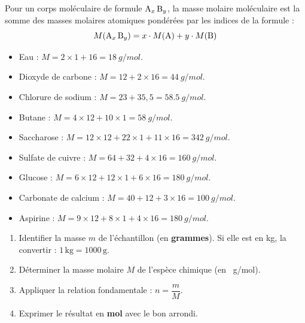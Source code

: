 \documentclass[11pt]{article}
\begin{document}
\begin{propriete}
Pour un corps moléculaire de formule $\ce{A_x B_y}$, la masse molaire moléculaire est la somme des masses molaires atomiques pondérées par les indices de la formule :
\[
M(\ce{A_x B_y}) = x \cdot M(\ce{A}) + y \cdot M(\ce{B})
\]
\end{propriete}

\begin{exemplebox}
\begin{itemize}
\item Eau  : $M = 2 \times 1 + 16 = \SI{18}{g/mol}$.
\item Dioxyde de carbone  : $M = 12 + 2 \times 16 = \SI{44}{g/mol}$.
\item Chlorure de sodium  : $M = 23 + 35,5 = \SI{58,5}{g/mol}$.
\item Butane  : $M = 4 \times 12 + 10 \times 1 = \SI{58}{g/mol}$.
\item Saccharose  : $M = 12 \times 12 + 22 \times 1 + 11 \times 16 = \SI{342}{g/mol}$.
\item Sulfate de cuivre  : $M = 64 + 32 + 4 \times 16 = \SI{160}{g/mol}$.
\item Glucose  : $M = 6 \times 12 + 12 \times 1 + 6 \times 16 = \SI{180}{g/mol}$.
\item Carbonate de calcium  : $M = 40 + 12 + 3 \times 16 = \SI{100}{g/mol}$.
\item Aspirine  : $M = 9 \times 12 + 8 \times 1 + 4 \times 16 = \SI{180}{g/mol}$.
\end{itemize}
\end{exemplebox}

\begin{methode}
\begin{enumerate}
\item Identifier la masse $m$ de l'échantillon (en \textbf{grammes}). Si elle est en kg, la convertir : $1\,\text{kg} = 1000\,\text{g}$.
\item Déterminer la masse molaire $M$ de l'espèce chimique (en \SI{}{g/mol}).
\item Appliquer la relation fondamentale : $n = \dfrac{m}{M}$.
\item Exprimer le résultat en \textbf{mol} avec le bon arrondi.
\end{enumerate}
\end{methode}
\end{document}
